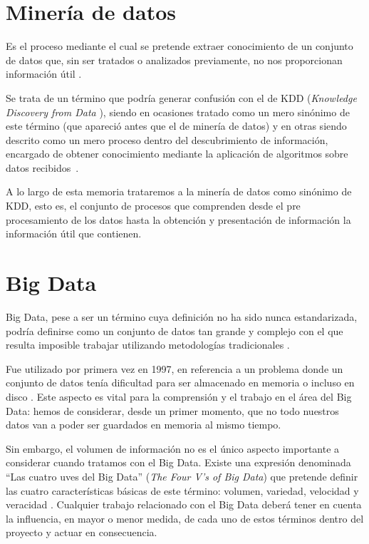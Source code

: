 

\section{Minería de datos}\label{DefMineria}

Es el proceso mediante el cual se pretende extraer conocimiento de un conjunto de datos que, sin ser tratados o analizados previamente, no nos proporcionan información útil \cite{DataMiningConcepts}.

Se trata de un término que podría generar confusión con el de KDD (\textit{Knowledge Discovery from Data} \cite{fayyad1996data}), siendo en ocasiones tratado como un mero sinónimo de este término (que apareció antes que el de minería de datos) y en otras siendo descrito como un mero proceso dentro del descubrimiento de información, encargado de obtener conocimiento mediante la aplicación de algoritmos sobre datos recibidos~\cite{DataMiningConcepts}. 

A lo largo de esta memoria trataremos a la minería de datos como sinónimo de KDD, esto es, el conjunto de procesos que comprenden desde el pre procesamiento de los datos hasta la obtención y presentación de información la información útil que contienen.

\section{Big Data}\label{sec:defBigData}

Big Data, pese a ser un término cuya definición no ha sido nunca estandarizada, podría definirse como un conjunto de datos tan grande y complejo con el que resulta imposible trabajar utilizando metodologías tradicionales \cite{bigDataDef}.

Fue utilizado por primera vez en 1997, en referencia a un problema donde un conjunto de datos tenía dificultad para ser almacenado en memoria o incluso en disco \cite{forbesBigData,cox1997application}. Este aspecto es vital para la comprensión y el trabajo en el área del Big Data: hemos de considerar, desde un primer momento, que no todo nuestros datos van a poder ser guardados en memoria al mismo tiempo.

Sin embargo, el volumen de información no es el único aspecto importante a considerar cuando tratamos con el Big Data. Existe una expresión denominada ``Las cuatro uves del Big Data'' (\textit{The Four V's of Big Data}) que pretende definir las cuatro características básicas de este término: volumen, variedad, velocidad y veracidad \cite{IBMBigData4Vs}. Cualquier trabajo relacionado con el Big Data deberá tener en cuenta la influencia, en mayor o menor medida, de cada uno de estos términos dentro del proyecto y actuar en consecuencia.

